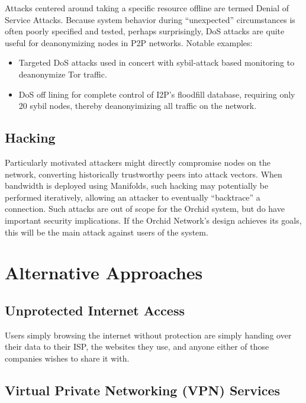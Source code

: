 \documentclass{article}
\newcommand{\orchid}{Orchid}
\newcommand{\Orchid}{\orchid}
\begin{document}
Attacks centered around taking a specific resource offline are termed Denial of Service Attacks. Because system behavior during “unexpected” circumstances is often poorly specified and tested, perhaps surprisingly, DoS attacks are quite useful for deanonymizing nodes in P2P networks. Notable examples:

\begin{itemize}
\item Targeted DoS attacks used in concert with sybil-attack based monitoring to deanonymize Tor traffic\cite{DOSvsSec}.
\item DoS off lining for complete control of I2P’s floodfill database, requiring only 20 sybil nodes, thereby deanonyimizing all traffic on the network\cite{I2P-vigna}.
\end{itemize}

\subsection{Hacking}

Particularly motivated attackers might directly compromise nodes on the network, converting historically trustworthy peers into attack vectors. When bandwidth is deployed using Manifolds, such hacking may potentially be performed iteratively, allowing an attacker to eventually ``backtrace'' a connection. Such attacks are out of scope for the \Orchid{} system, but do have important security implications. If the \Orchid{} Network's design achieves its goals, this will be the main attack against users of the system.


\section{Alternative Approaches}
\label{sec:prior-work}

\subsection{Unprotected Internet Access}

Users simply browsing the internet without protection are simply
handing over their data to their ISP, the websites they use, and
anyone either of those companies wishes to share it with.

\subsection{Virtual Private Networking (VPN) Services}
\end{document}
